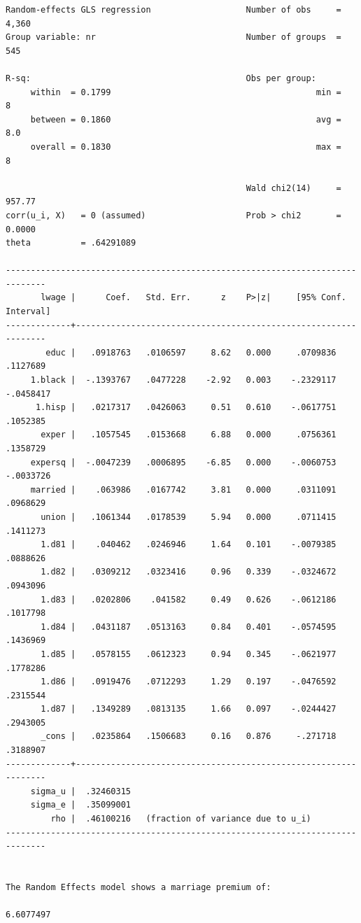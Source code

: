 \documentclass[
]{book}
\begin{document}
\begin{verbatim}
Random-effects GLS regression                   Number of obs     =      4,360
Group variable: nr                              Number of groups  =        545

R-sq:                                           Obs per group:
     within  = 0.1799                                         min =          8
     between = 0.1860                                         avg =        8.0
     overall = 0.1830                                         max =          8

                                                Wald chi2(14)     =     957.77
corr(u_i, X)   = 0 (assumed)                    Prob > chi2       =     0.0000
theta          = .64291089

------------------------------------------------------------------------------
       lwage |      Coef.   Std. Err.      z    P>|z|     [95% Conf. Interval]
-------------+----------------------------------------------------------------
        educ |   .0918763   .0106597     8.62   0.000     .0709836    .1127689
     1.black |  -.1393767   .0477228    -2.92   0.003    -.2329117   -.0458417
      1.hisp |   .0217317   .0426063     0.51   0.610    -.0617751    .1052385
       exper |   .1057545   .0153668     6.88   0.000     .0756361    .1358729
     expersq |  -.0047239   .0006895    -6.85   0.000    -.0060753   -.0033726
     married |    .063986   .0167742     3.81   0.000     .0311091    .0968629
       union |   .1061344   .0178539     5.94   0.000     .0711415    .1411273
       1.d81 |    .040462   .0246946     1.64   0.101    -.0079385    .0888626
       1.d82 |   .0309212   .0323416     0.96   0.339    -.0324672    .0943096
       1.d83 |   .0202806    .041582     0.49   0.626    -.0612186    .1017798
       1.d84 |   .0431187   .0513163     0.84   0.401    -.0574595    .1436969
       1.d85 |   .0578155   .0612323     0.94   0.345    -.0621977    .1778286
       1.d86 |   .0919476   .0712293     1.29   0.197    -.0476592    .2315544
       1.d87 |   .1349289   .0813135     1.66   0.097    -.0244427    .2943005
       _cons |   .0235864   .1506683     0.16   0.876     -.271718    .3188907
-------------+----------------------------------------------------------------
     sigma_u |  .32460315
     sigma_e |  .35099001
         rho |  .46100216   (fraction of variance due to u_i)
------------------------------------------------------------------------------


The Random Effects model shows a marriage premium of:

6.6077497
\end{verbatim}
\end{document}
